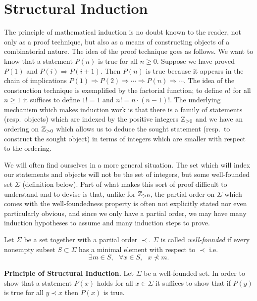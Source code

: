 
\section{Structural Induction}

The principle of mathematical induction is no doubt known to the
reader, not only as a proof technique, but also as a means of
constructing objects of a combinatorial nature. The idea of the proof
technique goes as follows. We want to know that a statement $P(n)$ is
true for all $n \ge 0$. Suppose we have proved $P(1)$ and $P(i)
\Rightarrow P(i+1)$. Then $P(n)$ is true because it appears in the
chain of implications $P(1) \Rightarrow P(2) \Rightarrow \cdots
\Rightarrow P(n) \Rightarrow \cdots$. The idea of the construction
technique is exemplified by the factorial function; to define $n!$ for
all $n \ge 1$ it suffices to define $1! = 1$ and $n! = n\cdot (n-1)!$.
The underlying mechanism which makes induction work is that there is a
family of statements (resp.~objects) which are indexed by the positive
integers $\mathbb{Z}_{>0}$ and we have an ordering on $\mathbb{Z}_{>0}$ which allows
us to deduce the sought statement (resp.~to construct the sought
object) in terms of integers which are smaller with respect to the
ordering.

We will often find ourselves in a more general situation. The set
which will index our statements and objects will not be the set of
integers, but some well-founded set $\Sigma$ (definition below). Part
of what makes this sort of proof difficult to understand and to devise
is that, unlike for $\mathbb{Z}_{>0}$, the partial order on $\Sigma$ which
comes with the well-foundedness property is often not explicitly
stated nor even particularly obvious, and since we only have a partial
order, we may have many induction hypotheses to assume and many
induction steps to prove.

\begin{defn} Let $\Sigma$ be a set together with a partial order
    $\prec$. $\Sigma$ is called \emph{well-founded} if every nonempty
    subset $S \subset \Sigma$ has a minimal element with respect to
    $\prec$ i.e. \[\exists m\in S, \text{ } \forall x\in S, \text{ } x
    \nprec m.\]
\end{defn}

\noindent \textbf{Principle of Structural Induction.} Let $\Sigma$ be
a well-founded set. In order to show that a statement $P(x)$ holds for
all $x\in \Sigma$ it suffices to show that if $P(y)$ is true for all
$y \prec x$ then $P(x)$ is true.

